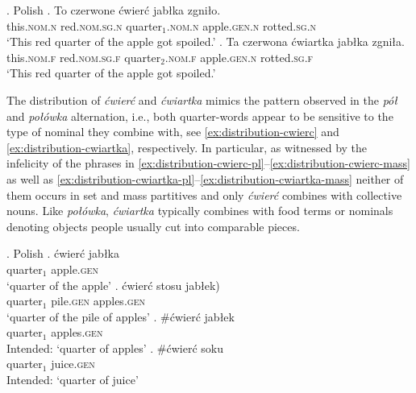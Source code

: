 \ex.\label{ex:polish-quarter-words-agreement} Polish
\ag. To czerwone ćwierć jabłka zgniło.\\
this\textsc{.nom.n} red\textsc{.nom.sg.n} quarter$_{1}$\textsc{.nom.n} apple\textsc{.gen.n} rotted\textsc{.sg.n}\\
`This red quarter of the apple got spoiled.'
\bg. Ta czerwona ćwiartka jabłka zgniła.\\
this\textsc{.nom.f} red\textsc{.nom.sg.f} quarter$_{2}$\textsc{.nom.f} apple\textsc{.gen.n} rotted\textsc{.sg.f}\\
`This red quarter of the apple got spoiled.'

The distribution of \textit{ćwierć} and \textit{ćwiartka} mimics the pattern observed in the \textit{pół} and \textit{połówka} alternation, i.e., both quarter-words appear to be sensitive to the type of nominal they combine with, see \ref{ex:distribution-cwierc} and \ref{ex:distribution-cwiartka}, respectively. In particular, as witnessed by the infelicity of the phrases in \ref{ex:distribution-cwierc-pl}--\ref{ex:distribution-cwierc-mass} as well as \ref{ex:distribution-cwiartka-pl}--\ref{ex:distribution-cwiartka-mass} neither of them occurs in set and mass partitives and only \textit{ćwierć} combines with collective nouns. Like \textit{połówka}, \textit{ćwiartka} typically combines with food terms or nominals denoting objects people usually cut into comparable pieces.\largerpage

		\ex.\label{ex:distribution-cwierc} Polish
        \ag. ćwierć jabłka\label{ex:distribution-cwierc-sg}\\
		quarter$_1$ apple\textsc{.gen}\\
		`quarter of the apple'
		\bg. ćwierć  stosu \minsp{(} jabłek)\label{ex:distribution-cwierc-group}\\
		quarter$_1$ pile\textsc{.gen} {} apples\textsc{.gen}\\
		`quarter of the pile of apples'
		\bg. \#ćwierć jabłek\label{ex:distribution-cwierc-pl}\\
		quarter$_1$ apples\textsc{.gen}\\
		Intended: `quarter of apples'
		\bg. \#ćwierć soku\label{ex:distribution-cwierc-mass}\\
		quarter$_1$ juice\textsc{.gen}\\
		Intended: `quarter of juice'

